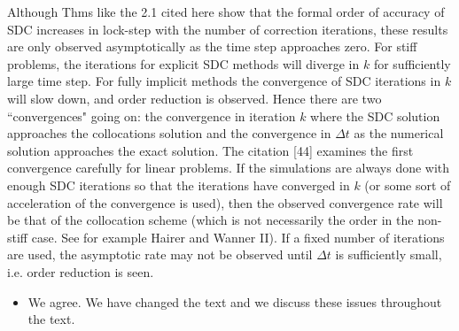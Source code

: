 \documentclass[12pt]{article}
\newcommand{\comment}[1]{{\color{blue} #1}}
\begin{document}
\comment{Although Thms like the 2.1 cited here show that the formal
order of accuracy of SDC increases in lock-step with the number of
correction iterations, these results are only observed asymptotically as
the time step approaches zero. For stiff problems, the iterations for
explicit SDC methods will diverge in $k$ for sufficiently large time
step.  For fully implicit methods the convergence of SDC iterations in
$k$ will slow down, and order reduction is observed. Hence there are two
``convergences" going on: the convergence in iteration $k$ where the SDC
solution approaches the collocations solution and the convergence in
$\Delta t$ as the numerical solution approaches the exact solution. The
citation [44] examines the first convergence carefully for linear
problems. If the simulations are always done with enough SDC iterations
so that the iterations have converged in $k$ (or some sort of
acceleration of the convergence is used), then the observed convergence
rate will be that of the collocation scheme (which is not necessarily
the order in the non-stiff case. See for example Hairer and Wanner II).
If a fixed number of iterations are used, the asymptotic rate may not be
observed until $\Delta t$ is sufficiently small, i.e. order reduction is
seen.}
\begin{itemize}
  \item We agree. We have changed the text and we discuss these issues
  throughout the text.
\end{itemize}
\end{document}

